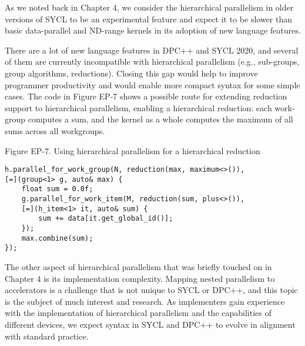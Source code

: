 As we noted back in Chapter 4, we consider the hierarchical parallelism in older versions of SYCL to be an experimental feature and expect it to be slower than basic data-parallel and ND-range kernels in its adoption of new language features.\par

There are a lot of new language features in DPC++ and SYCL 2020, and several of them are currently incompatible with hierarchical parallelism (e.g., sub-groups, group algorithms, reductions). Closing this gap would help to improve programmer productivity and would enable more compact syntax for some simple cases. The code in Figure EP-7 shows a possible route for extending reduction support to hierarchical parallelism, enabling a hierarchical reduction: each work-group computes a sum, and the kernel as a whole computes the maximum of all sums across all workgroups.\par

\hspace*{\fill} \par %
Figure EP-7. Using hierarchical parallelism for a hierarchical reduction
\begin{lstlisting}[caption={}]
h.parallel_for_work_group(N, reduction(max, maximum<>()),
[=](group<1> g, auto& max) {
	float sum = 0.0f;
	g.parallel_for_work_item(M, reduction(sum, plus<>()),
	[=](h_item<1> it, auto& sum) {
		sum += data[it.get_global_id()];
	});
	max.combine(sum);
});
\end{lstlisting}

The other aspect of hierarchical parallelism that was briefly touched on in Chapter 4 is its implementation complexity. Mapping nested parallelism to accelerators is a challenge that is not unique to SYCL or DPC++, and this topic is the subject of much interest and research. As implementers gain experience with the implementation of hierarchical parallelism and the capabilities of different devices, we expect syntax in SYCL and DPC++ to evolve in alignment with standard practice.\par
















































